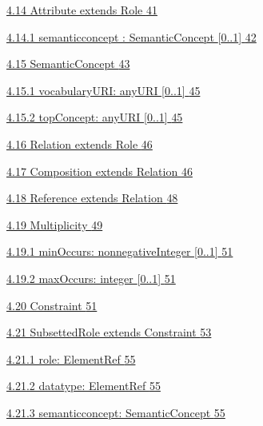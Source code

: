 \documentclass[10pt,a4paper]{ivoa}
\begin{document}
\protect\hyperlink{attribute-extends-role}{4.14 Attribute extends Role
\protect\hyperlink{attribute-extends-role}{41}}

\protect\hyperlink{semanticconcept-semanticconcept-0..1}{4.14.1
semanticconcept : SemanticConcept {[}0..1{]}
\protect\hyperlink{semanticconcept-semanticconcept-0..1}{42}}

\protect\hyperlink{semanticconcept}{4.15 SemanticConcept
\protect\hyperlink{semanticconcept}{43}}

\protect\hyperlink{vocabularyuri-anyuri-0..1}{4.15.1 vocabularyURI:
anyURI {[}0..1{]} \protect\hyperlink{vocabularyuri-anyuri-0..1}{45}}

\protect\hyperlink{topconcept-anyuri-0..1}{4.15.2 topConcept: anyURI
{[}0..1{]} \protect\hyperlink{topconcept-anyuri-0..1}{45}}

\protect\hyperlink{relation-extends-role}{4.16 Relation extends Role
\protect\hyperlink{relation-extends-role}{46}}

\protect\hyperlink{composition-extends-relation}{4.17 Composition
extends Relation \protect\hyperlink{composition-extends-relation}{46}}

\protect\hyperlink{reference-extends-relation}{4.18 Reference extends
Relation \protect\hyperlink{reference-extends-relation}{48}}

\protect\hyperlink{multiplicity}{4.19 Multiplicity
\protect\hyperlink{multiplicity}{49}}

\protect\hyperlink{minoccurs-nonnegativeinteger-0..1}{4.19.1 minOccurs:
nonnegativeInteger {[}0..1{]}
\protect\hyperlink{minoccurs-nonnegativeinteger-0..1}{51}}

\protect\hyperlink{maxoccurs-integer-0..1}{4.19.2 maxOccurs: integer
{[}0..1{]} \protect\hyperlink{maxoccurs-integer-0..1}{51}}

\protect\hyperlink{constraint}{4.20 Constraint
\protect\hyperlink{constraint}{51}}

\protect\hyperlink{subsettedrole-extends-constraint}{4.21 SubsettedRole
extends Constraint
\protect\hyperlink{subsettedrole-extends-constraint}{53}}

\protect\hyperlink{role-elementref}{4.21.1 role: ElementRef
\protect\hyperlink{role-elementref}{55}}

\protect\hyperlink{datatype-elementref-1}{4.21.2 datatype: ElementRef
\protect\hyperlink{datatype-elementref-1}{55}}

\protect\hyperlink{semanticconcept-semanticconcept}{4.21.3
semanticconcept: SemanticConcept
\protect\hyperlink{semanticconcept-semanticconcept}{55}}
\end{document}
